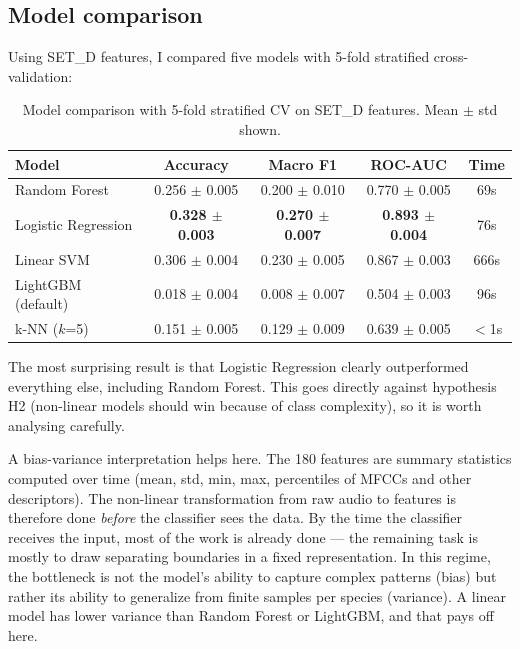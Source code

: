 \documentclass[11pt,a4paper]{article}
\begin{document}
\subsection{Model comparison}

Using SET\_D features, I compared five models with 5-fold stratified cross-validation:

\begin{table}[H]
\centering
\begin{tabular}{lcccc}
\toprule
Model & Accuracy & Macro F1 & ROC-AUC & Time \\
\midrule
Random Forest & 0.256 $\pm$ 0.005 & 0.200 $\pm$ 0.010 & 0.770 $\pm$ 0.005 & 69s \\
Logistic Regression & \textbf{0.328 $\pm$ 0.003} & \textbf{0.270 $\pm$ 0.007} & \textbf{0.893 $\pm$ 0.004} & 76s \\
Linear SVM & 0.306 $\pm$ 0.004 & 0.230 $\pm$ 0.005 & 0.867 $\pm$ 0.003 & 666s \\
LightGBM (default) & 0.018 $\pm$ 0.004 & 0.008 $\pm$ 0.007 & 0.504 $\pm$ 0.003 & 96s \\
k-NN ($k$=5) & 0.151 $\pm$ 0.005 & 0.129 $\pm$ 0.009 & 0.639 $\pm$ 0.005 & $<$1s \\
\bottomrule
\end{tabular}
\caption{Model comparison with 5-fold stratified CV on SET\_D features. Mean $\pm$ std shown.}
\label{tab:models}
\end{table}

The most surprising result is that Logistic Regression clearly outperformed everything else, including Random Forest. This goes directly against hypothesis H2 (non-linear models should win because of class complexity), so it is worth analysing carefully.

A bias-variance interpretation helps here. The 180 features are summary statistics computed over time (mean, std, min, max, percentiles of MFCCs and other descriptors). The non-linear transformation from raw audio to features is therefore done \textit{before} the classifier sees the data. By the time the classifier receives the input, most of the work is already done — the remaining task is mostly to draw separating boundaries in a fixed representation. In this regime, the bottleneck is not the model's ability to capture complex patterns (bias) but rather its ability to generalize from finite samples per species (variance). A linear model has lower variance than Random Forest or LightGBM, and that pays off here.
\end{document}
